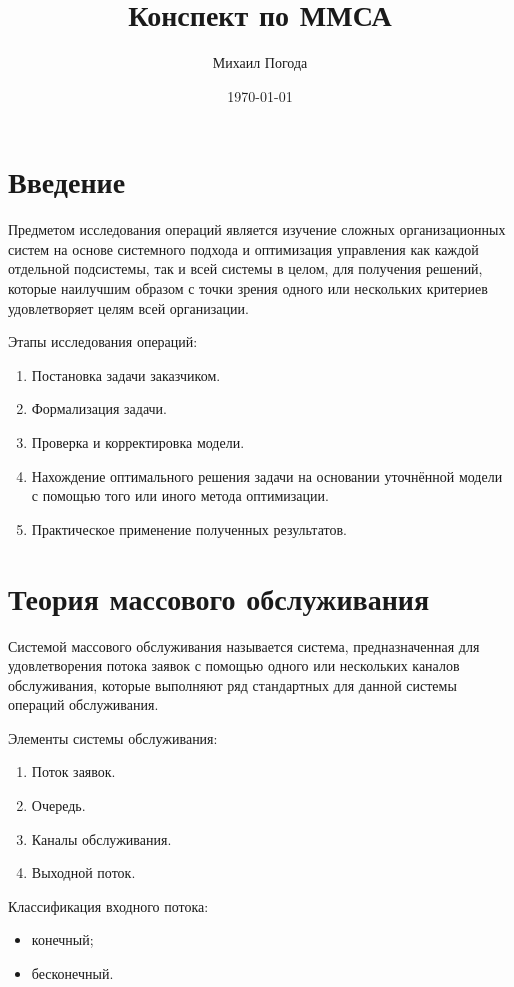 \documentclass[a4paper,10pt,notitlepage,pdftex,headsepline]{scrartcl}
\author{Михаил Погода}
\title{Конспект по ММСА}
\date{\today}
\begin{document}
\begin{titlepage}
  \maketitle
\end{titlepage}

\tableofcontents
\newpage

\section{Введение}
  Предметом исследования операций является изучение сложных организационных
  систем на основе системного подхода и оптимизация управления как каждой
  отдельной подсистемы, так и всей системы в целом, для получения решений,
  которые наилучшим образом с точки зрения одного или нескольких критериев
  удовлетворяет целям всей организации.

  Этапы исследования операций:
  \begin{enumerate}
    \item Постановка задачи заказчиком.
    \item Формализация задачи.
    \item Проверка и корректировка модели.
    \item Нахождение оптимального решения задачи на основании уточнённой модели
      с помощью того или иного метода оптимизации.
    \item Практическое применение полученных результатов.
  \end{enumerate}
\section{Теория массового обслуживания}
  Системой массового обслуживания называется система, предназначенная для
  удовлетворения потока заявок с помощью одного или нескольких каналов
  обслуживания, которые выполняют ряд стандартных для данной системы операций
  обслуживания.

  Элементы системы обслуживания:
  \begin{enumerate}
    \item Поток заявок.
    \item Очередь.
    \item Каналы обслуживания.
    \item Выходной поток.
  \end{enumerate}

  Классификация входного потока:
  \begin{itemize}
    \item конечный;
    \item бесконечный.
  \end{itemize}
\end{document}
